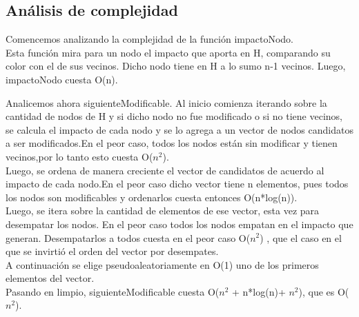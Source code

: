 \quad


\subsection{Análisis de complejidad}

\indent Comencemos analizando la complejidad de la función impactoNodo.\\
\indent Esta función mira para un nodo el impacto que aporta en H, comparando su color con el de sus vecinos. Dicho nodo tiene en H a lo sumo n-1 vecinos. Luego, impactoNodo cuesta O(n).

\indent Analicemos ahora siguienteModificable. Al inicio comienza iterando sobre la cantidad de nodos de H y si dicho nodo no fue modificado o si no tiene vecinos, se calcula el impacto de cada nodo y se lo agrega a un vector de nodos candidatos a ser modificados.En el peor caso, todos los nodos están sin modificar y tienen vecinos,por lo tanto esto cuesta O($n^{2}$).\\
\indent Luego, se ordena de manera creciente el vector de candidatos de acuerdo al impacto de cada nodo.En el peor caso dicho vector tiene n elementos, pues todos los nodos son modificables y ordenarlos cuesta entonces O(n*log(n)).\\
\indent Luego, se itera sobre la cantidad de elementos de ese vector, esta vez para desempatar los nodos. En el peor caso todos los nodos empatan en el impacto que generan. Desempatarlos a todos cuesta en el peor caso O($n^{2}$) , que el caso en el que se invirtió el orden del vector por desempates.\\
\indent A continuación se elige pseudoaleatoriamente en O(1) uno de los primeros elementos del vector.\\
\indent Pasando en limpio, siguienteModificable cuesta O($n^2$ + n*log(n)+ $n^2$), que es O($n^{2}$).\\

